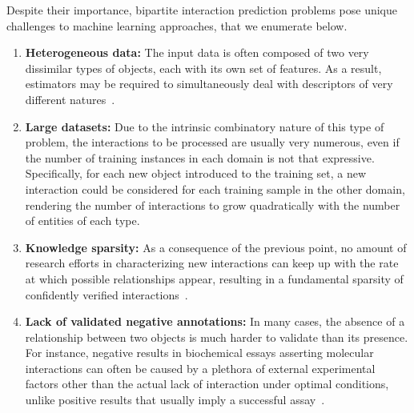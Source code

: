 Despite their importance, bipartite interaction prediction problems pose unique challenges to machine learning approaches, that we enumerate below.
%
\begin{enumerate}
    \item \textbf{Heterogeneous data:} The input data is often composed of two very dissimilar types of objects, each with its own set of features. As a result, estimators may be required to simultaneously deal with descriptors of very different natures~\cite{bagherian2020machine}.  %
    \item \textbf{Large datasets:} Due to the intrinsic combinatory nature of this type of problem, the interactions to be processed are usually very numerous, even if the number of training instances in each domain is not that expressive.  %
    Specifically, for each new object introduced to the training set, a new interaction could be considered for each training sample in the other domain, rendering the number of interactions to grow quadratically with the number of entities of each type.
    \item \textbf{Knowledge sparsity:} As a consequence of the previous point, no amount of research efforts in characterizing new interactions can keep up with the rate at which possible relationships appear, resulting in a fundamental sparsity of confidently verified interactions~\cite{bagherian2020machine}. %
    \item \textbf{Lack of validated negative annotations:} In many cases, the absence of a relationship between two objects is much harder to validate than its presence. For instance, negative results in biochemical essays asserting molecular interactions can often be caused by a plethora of external experimental factors other than the actual lack of interaction under optimal conditions, unlike positive results that usually imply a successful assay~\cite{pahikkala2015more,chen2018machine,bagherian2020machine}.

\end{enumerate}
